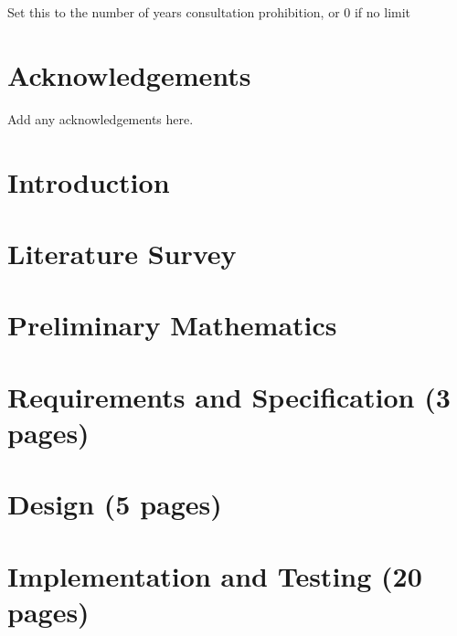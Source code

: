 
\maketitle
\newpage
 Set this to the number of years consultation prohibition, or 0 if no limit
\newpage


\declaration{\disstitle}{\authorname} %
\newpage


\abstract

\newpage


\tableofcontents
\newpage
\listoffigures
\newpage
\listoftables
\newpage

\chapter*{Acknowledgements}
Add any acknowledgements here.
\newpage

\listoftodos

\setcounter{page}{1}



\chapter{Introduction}

\chapter{Literature Survey}

\chapter{Preliminary Mathematics}


\chapter{Requirements and Specification (3 pages)}


\chapter{Design (5 pages)}


\chapter{Implementation and Testing (20 pages)}



